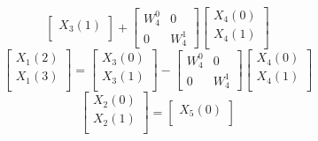 \documentclass[journal,12pt,twocolumn]{IEEEtran}
\renewcommand\thesection{\arabic{section}}
\begin{document}
\begin{enumerate}[label=\arabic*.,ref=\thesection.\theenumi]
\begin{equation}
\begin{bmatrix}
                     X_{3}(1) \\
                \end{bmatrix}
                +
                \begin{bmatrix}
                     W^{0}_{4} & 0         \\
                     0         & W^{1}_{4}
                \end{bmatrix}
                \begin{bmatrix}
                     X_{4}(0) \\
                     X_{4}(1) \\
                \end{bmatrix}
           \end{equation}
           \begin{equation}
                \begin{bmatrix}
                     X_{1}(2) \\
                     X_{1}(3) \\
                \end{bmatrix}
                =
                \begin{bmatrix}
                     X_{3}(0) \\
                     X_{3}(1) \\
                \end{bmatrix}
                -
                \begin{bmatrix}
                     W^{0}_{4} & 0         \\
                     0         & W^{1}_{4}
                \end{bmatrix}
                \begin{bmatrix}
                     X_{4}(0) \\
                     X_{4}(1) \\
                \end{bmatrix}
           \end{equation}
           \begin{equation}
                \begin{bmatrix}
                     X_{2}(0) \\
                     X_{2}(1) \\
                \end{bmatrix}
                =
                \begin{bmatrix}
                     X_{5}(0) \\

\end{bmatrix}
\end{equation}
\end{enumerate}
\end{document}
